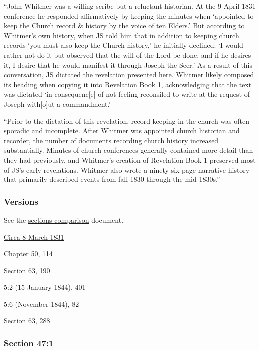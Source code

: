 			``John Whitmer was a willing scribe but a reluctant historian. At the 9 April 1831 conference he responded affirmatively by keeping the minutes when `appointed to keep the Church record \& history by the voice of ten Elders.' But according to Whitmer's own history, when JS told him that in addition to keeping church records `you must also keep the Church history,' he initially declined: `I would rather not do it but observed that the will of the Lord be done, and if he desires it, I desire that he would manifest it through Joseph the Seer.' As a result of this conversation, JS dictated the revelation presented here. Whitmer likely composed its heading when copying it into Revelation Book 1, acknowledging that the text was dictated `in consequenc[e] of not feeling reconsiled to write at the request of Joseph with[o]ut a commandment.'
			
			``Prior to the dictation of this revelation, record keeping in the church was often sporadic and incomplete. After Whitmer was appointed church historian and recorder, the number of documents recording church history increased substantially. Minutes of church conferences generally contained more detail than they had previously, and Whitmer's creation of Revelation Book 1 preserved most of JS's early revelations. Whitmer also wrote a ninety-six-page narrative history that primarily described events from fall 1830 through the mid-1830s.''
		
	\subsubsection{Versions}
		\label{DC47-V}
		
		See the \href{https://drive.google.com/file/d/1goAvNz8jS4R8slYfMG_db55Ty2z_vmgK/view?usp=sharing}{sections comparison} document.
	
		\begin{compactdesc}
			\item[JSP] \hyperref[EMS-1831-JS-CIR-8-MAR-1831-B]{Circa 8 March 1831}
			\item[BC] Chapter 50, 114
			\item[DC 1835] Section 63, 190
			\item[TS] 5:2 (15 January 1844), 401
			\item[MS] 5:6 (November 1844), 82
			\item[DC 1844] Section 63, 288
		\end{compactdesc}

	\subsubsection{Section 47:1} %
		\label{DC47-1}

